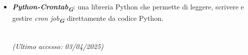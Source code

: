 \begin{itemize}
    \item \textbf{\emph{Python-Crontab}\textsubscript{\textit{\textbf{G}}}}: una libreria Python che permette di leggere, scrivere e gestire {\emph{cron job}\textsubscript{\textit{\textbf{G}}}} direttamente da codice Python.
    \begin{center}
         \\
        \emph{(Ultimo accesso: 03/04/2025)}
    \end{center}
   
\end{itemize}


